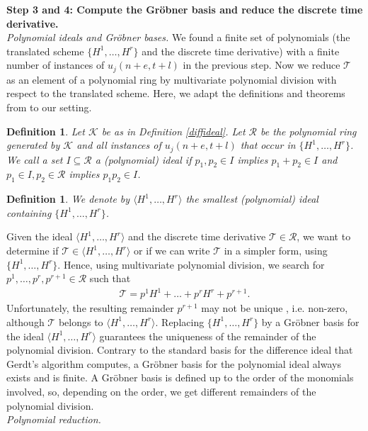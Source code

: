 \documentclass[manuscript]{acmart}
\newcommand{\1}{{\chi}}
\numberwithin{equation}{section}
\theoremstyle{thmlemcorr}
\numberwithin{theorem}{section}
\theoremstyle{thmlemcorr*}
\theoremstyle{defi}
\newtheorem{definition}[theorem]{Definition}
\theoremstyle{remexample}
\theoremstyle{ass}
\begin{document}
{\bf Step 3 and 4: Compute the Gr{\"o}bner basis and reduce the discrete time derivative.}\\
	\emph{Polynomial ideals and Gr{\"o}bner bases.}\label{polid}
	We found a finite set of polynomials (the translated scheme $\{H^1,\ldots,H^r\}$ and the discrete time derivative) with a finite number of instances of $u_j(n+e,t+l)$ in the previous step. Now we reduce $\mathcal{T}$ as an element of a polynomial ring by multivariate polynomial division with respect to the translated scheme. Here, we adapt the definitions and theorems from \cite{hibi13} to our setting.
	\begin{definition}
		Let $\mathcal{K}$ be as in Definition \ref{diffideal}. Let $\mathcal{R}$ be the polynomial ring generated by $\mathcal{K}$ and all instances of $u_j(n+e,t+l)$ that occur in $\{H^1,\ldots,H^r\}$.
		We call a set $ I\subseteq \mathcal{R}$ a \emph{(polynomial) ideal} if
		$p_1,p_2\in I$ implies $p_1+p_2\in I$ and
		 $p_1\in I,p_2\in\mathcal{R}$ implies $p_1p_2\in I$.
	\end{definition}
	\begin{definition}
		We denote by $\langle H^1,\ldots,H^r\rangle$ the smallest (polynomial) ideal containing $\{H^1,\ldots,H^r\}$.
	\end{definition}
	Given the ideal $\langle H^1,\ldots,H^r\rangle$ and the discrete time derivative $\mathcal{T}\in\mathcal{R}$, we want to determine if $\mathcal{T}\in\langle H^1,\ldots,H^r\rangle$ or if we can write $\mathcal{T}$ in a simpler form, using $\{H^1,\ldots,H^r\}$.
	Hence, using multivariate polynomial division, we search for $p^1,\ldots,p^r,p^{r+1}\in\mathcal{R}$ such that
	\begin{gather*}
		\mathcal{T}=p^1H^1+\ldots+p^rH^r+p^{r+1}.
	\end{gather*}
	Unfortunately, the resulting remainder $p^{r+1}$ may not be unique \cite[page 14, Example 1.2.3]{hibi13}, i.e. non-zero, although $\mathcal{T}$ belongs to $\langle H^1,\ldots,H^r \rangle$. 
	Replacing $\{H^1,\ldots,H^r\}$ by a Gr{\"o}bner basis for the ideal $\langle H^1,\ldots,H^r \rangle$ guarantees the uniqueness of the remainder of the polynomial division. 
	Contrary to the standard basis for the difference ideal that Gerdt's algorithm computes, a Gr{\"o}bner basis for the polynomial ideal always exists and is finite.
	A Gr{\"o}bner basis is defined up to the order of the monomials involved, so, depending on the order, we get different remainders of the polynomial division.\\
	\emph{Polynomial reduction.}
\end{document}
